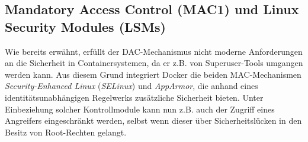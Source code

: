 \documentclass[../main.tex]{subfiles}
\begin{document}




    \subsection{Mandatory Access Control (\acrshort{MAC1}) und Linux Security Modules (\acrshort{LSM}s)}
			Wie bereits erwähnt, erfüllt der DAC-Mechanismus nicht moderne Anforderungen an die Sicherheit in Containersystemen, da er z.B. von Superuser-Tools umgangen werden kann. Aus diesem Grund integriert Docker die beiden MAC-Mechanismen \emph{Security-Enhanced Linux} (\emph{SELinux}) und \emph{AppArmor}, die anhand eines identitätsunabhängigen Regelwerks zusätzliche Sicherheit bieten. Unter Einbeziehung solcher Kontrollmodule kann nun z.B. auch der Zugriff eines Angreifers eingeschränkt werden, selbst wenn dieser über Sicherheitslücken in den Besitz von Root-Rechten gelangt.
\end{document}
